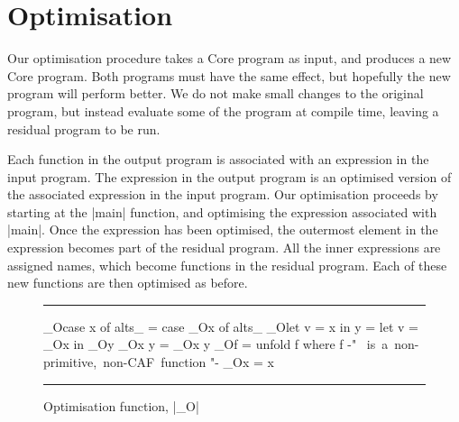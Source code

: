 \documentclass{llncs}
\newenvironment{fig}
    {\begin{figure}[tbp]\hrule}
    {\end{figure}}
\newcommand{\figend}{\hrule}
\begin{document}
\section{Optimisation}
\label{sec:optimisation}

Our optimisation procedure takes a Core program as input, and produces a new Core program. Both programs must have the same effect, but hopefully the new program will perform better. We do not make small changes to the original program, but instead evaluate some of the program at compile time, leaving a residual program to be run.

Each function in the output program is associated with an expression in the input program. The expression in the output program is an optimised version of the associated expression in the input program. Our optimisation proceeds by starting at the |main| function, and optimising the expression associated with |main|. Once the expression has been optimised, the outermost element in the expression becomes part of the residual program. All the inner expressions are assigned names, which become functions in the residual program. Each of these new functions are then optimised as before.

\begin{fig}
\begin{code}
_O\<case x of alts_  \> =  case _O\<x\> \? of alts_
_O\<let v = x in y   \> =  let v = _O\<x\> \? in _O\<y\>
_O\<x y              \> =  _O\<x\> \? y
_O\<f                \> =  unfold f
                           where f {-" \hbox{ is a non-primitive, non-CAF function} "-}
_O\<x                \> =  x
\end{code}
\figend
\caption{Optimisation function, |_O|}
\label{fig:optimise}
\end{fig}
\end{document}
